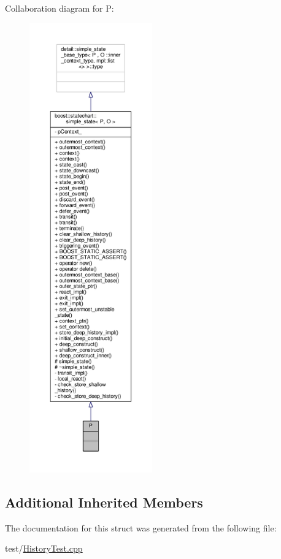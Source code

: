 Collaboration diagram for P\+:
\nopagebreak
\begin{figure}[H]
\begin{center}
\leavevmode
\includegraphics[height=550pt]{struct_p__coll__graph}
\end{center}
\end{figure}
\subsection*{Additional Inherited Members}


The documentation for this struct was generated from the following file\+:\begin{DoxyCompactItemize}
\item 
test/\mbox{\hyperlink{_history_test_8cpp}{History\+Test.\+cpp}}\end{DoxyCompactItemize}
